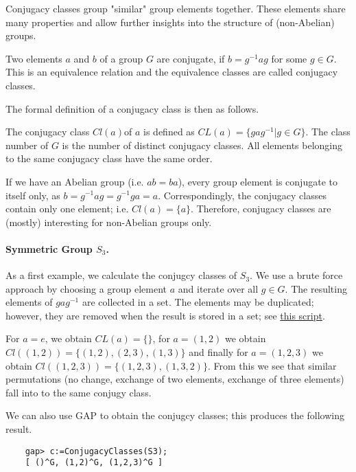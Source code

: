 
Conjugacy classes group "similar" group elements together. These elements share many properties and allow further insights into the structure of (non-Abelian) groups.

\begin{definition}
    Two elements $a$ and $b$ of a group $G$ are conjugate, if $b = g^{-1}ag$ for some $g \in G$. This is an equivalence relation and the equivalence classes are called conjugacy classes.    
\end{definition}

The formal definition of a conjugacy class is then as follows.

\begin{definition}
    The conjugacy class $Cl(a)$of $a$ is defined as $CL(a) = \{gag^{-1} | g \in G\}$. The class number of $G$ is the number of distinct conjugacy classes. All elements belonging to the same conjugacy class have the same order.
\end{definition}

If we have an Abelian group (i.e. $ab = ba$), every group element is conjugate to itself only, as $b = g^{-1}ag = g^{-1}ga = a$. Correspondingly, the conjugacy classes contain only one element; i.e. $Cl(a) = \{a\}$. Therefore, conjugacy classes are (mostly) interesting for non-Abelian groups only.

\paragraph{Symmetric Group $S_3$.} As a first example, we calculate the conjugcy classes of $S_3$. We use a brute force approach by choosing a group element $a$ and iterate over all $g \in G$. The resulting elements of $gag^{-1}$ are collected in a set. The elements may be duplicated; however, they are removed when the result is stored in a set; see \href{file/gap_conjugcy_classes.gp}{this script}.

For $a = e$, we obtain $CL(a) = \{\}$, for $a = (1,2)$ we obtain $Cl((1,2)) = \{(1,2), (2,3), (1,3)\}$ and finally for $a = (1,2,3)$ we obtain $Cl((1,2,3)) = \{(1,2,3), (1,3,2)\}$. From this we see that similar permutations (no change, exchange of two elements, exchange of three elements) fall into to the same conjugy class.

We can also use GAP to obtain the conjugcy classes; this produces the following result.

\begin{verbatim}
    gap> c:=ConjugacyClasses(S3);
    [ ()^G, (1,2)^G, (1,2,3)^G ]
\end{verbatim}

